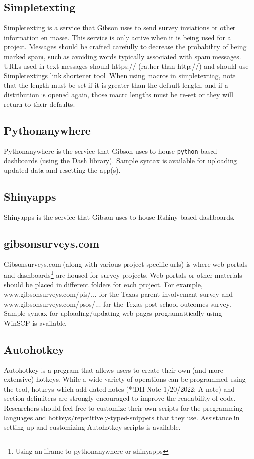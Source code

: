 {\subsection{Simpletexting}
Simpletexting is a service that Gibson uses to send survey inviations or other information en masse. This service is only active when it is being used for a project. Messages should be crafted carefully to decrease the probability of being marked spam, such as avoiding words typically associated with spam messages. URLs used in text messages should https:// (rather than http://) and should use Simpletextings link shortener tool. When using macros in simpletexting, note that the length must be set if it is greater than the default length, and if a distribution is opened again, those macro lengths must be re-set or they will return to their defaults.

\subsection{Pythonanywhere}
Pythonanywhere is the service that Gibson uses to house \texttt{python}-based dashboards (using the Dash library). Sample syntax is available for uploading updated data and resetting the app(s).

\subsection{Shinyapps}
Shinyapps is the service that Gibson uses to house Rshiny-based dashboards.

\subsection{gibsonsurveys.com}
Gibsonsurveys.com (along with various project-specific urls) is where web portals and dashboards\footnote{Using an iframe to pythonanywhere or shinyapps} are housed for survey projects. Web portals or other materials should be placed in different folders for each project. For example, www.gibsonsurveys.com/pis/... for the Texas parent involvement survey and www.gibsonsurveys.com/psos/... for the Texas post-school outcomes survey. Sample syntax for uploading/updating web pages programattically using WinSCP is available.

\subsection{Autohotkey}
Autohotkey is a program that allows users to create their own (and more extensive) hotkeys. While a wide variety of operations can be programmed using the tool, hotkeys which add dated notes (*!DH Note 1/20/2022: A note) and section delimiters are strongly encouraged to improve the readability of code. Researchers should feel free to customize their own scripts for the programming languages and hotkeys/repetitively-typed-snippets that they use. Assistance in setting up and customizing Autohotkey scripts is available.

}
